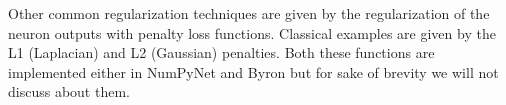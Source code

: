 \documentclass{standalone}
\begin{document}
Other common regularization techniques are given by the regularization of the neuron outputs with penalty loss functions.
Classical examples are given by the L1 (Laplacian) and L2 (Gaussian) penalties.
Both these functions are implemented either in \textsf{NumPyNet} and \textsf{Byron} but for sake of brevity we will not discuss about them.
\end{document}
